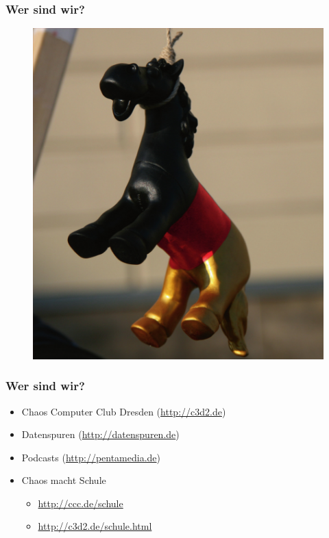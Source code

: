 \documentclass[12pt]{beamer}
\begin{document}
\begin{frame}
  \frametitle{Wer sind wir?}
  \begin{figure}
    \includegraphics[height=0.7\textheight]{img/trojaner.jpg}
  \end{figure}
\end{frame}

\begin{frame}
    \frametitle{Wer sind wir?}
    \begin{itemize}
      \item<1-> Chaos Computer Club Dresden (\url{http://c3d2.de})
          \note{}
      \item<2-> Datenspuren (\url{http://datenspuren.de})
      \item<3-> Podcasts (\url{http://pentamedia.de})
      \item<4-> Chaos macht Schule
        \begin{itemize}
          \item<2-> \url{http://ccc.de/schule}
          \item<2-> \url{http://c3d2.de/schule.html}
        \end{itemize}
    \end{itemize}
\end{frame}
\end{document}
